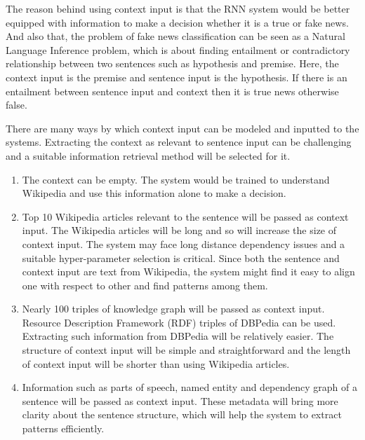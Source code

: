 \documentclass[a4paper, 11pt]{article}
\begin{document}
The reason behind using context input is that the RNN system would be better equipped with information to make a decision whether it is a true or fake news. And also that, the problem of fake news classification can be seen as a Natural Language Inference \parencite{Parikh2016} problem, which is about finding entailment or contradictory relationship between two sentences such as hypothesis and premise. Here, the context input is the premise and sentence input is the hypothesis. If there is an entailment between sentence input and context then it is true news otherwise false.

There are many ways by which context input can be modeled and inputted to the systems. \color{red}Extracting the context as relevant to sentence input can be challenging and a suitable information retrieval method will be selected for it.\color{black}

\begin{enumerate}
\item The context can be empty. The system would be trained to understand Wikipedia and use this information alone to make a decision.
\item Top 10 Wikipedia articles relevant to the sentence will be passed as context input. The Wikipedia articles will be long and so will increase the size of context input. The system may face long distance dependency issues and a suitable hyper-parameter selection is critical. Since both the sentence and context input are text from Wikipedia, the system might find it easy to align one with respect to other and find patterns among them. 
\item Nearly 100 triples of knowledge graph will be passed as context input. Resource Description Framework (RDF) triples of DBPedia can be used. Extracting such information from DBPedia will be relatively easier. The structure of context input will be simple and straightforward and the length of context input will be shorter than using Wikipedia articles.  
\item Information such as parts of speech, named entity and dependency graph of a sentence will be passed as context input. These metadata will bring more clarity about the sentence structure, which will help the system to extract patterns efficiently. 
\end{enumerate}
\end{document}
